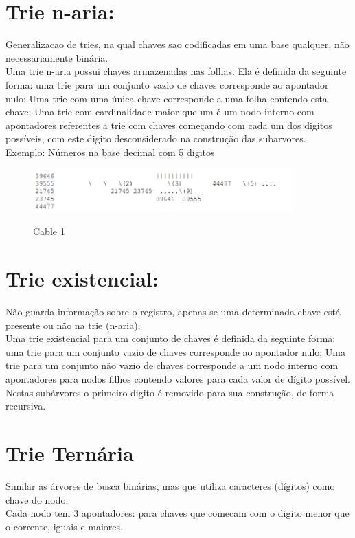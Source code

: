 \documentclass{article}
\begin{document}
\newpage

\section{Trie n-aria:}
Generalizacao de tries, na qual chaves sao codificadas em uma base qualquer,
não necessariamente binária.\\

Uma trie n-aria possui chaves armazenadas nas folhas.  Ela é definida da seguinte forma: uma trie
para um conjunto vazio de chaves corresponde ao apontador nulo; Uma trie com uma única chave corresponde a uma folha contendo 
esta chave; Uma trie com cardinalidade maior que um é um nodo interno com apontadores referentes a
trie com chaves começando com cada um dos digitos possíveis, com este digito desconsiderado na
construção das subarvores.\\

Exemplo: Números na base decimal com 5 digitos\\

\begin{figure}[h]
    \center
    \includegraphics[width=10cm]{imagens/trienaria.png}
    \label{cable}
    \caption{Cable 1}
\end{figure}


\section{Trie existencial:}
Não guarda informação sobre o registro, apenas se uma determinada chave está presente ou não na trie
(n-aria).\\
Uma trie existencial para um conjunto de chaves é definida da seguinte forma: uma trie para um
conjunto vazio de chaves corresponde ao apontador nulo; Uma trie para um conjunto não vazio de
chaves corresponde a um nodo interno com apontadores para nodos filhos contendo valores para cada
valor de dígito possível. Nestas subárvores o primeiro digito é removido para sua construção, de forma recursiva.

\section{Trie Ternária}
Similar as árvores de busca binárias, mas que utiliza caracteres (dígitos) como chave do nodo.
\\Cada nodo tem 3 apontadores: para chaves que comecam com o digito menor que o corrente, iguais e
maiores.\\
\end{document}
